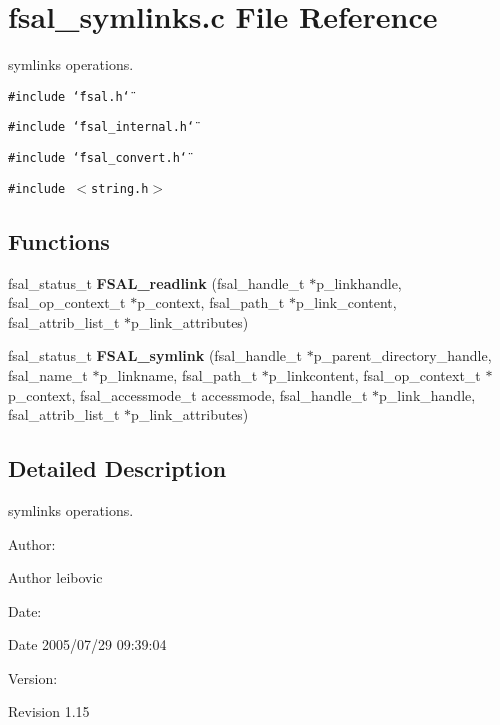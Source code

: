 \section{fsal\_\-symlinks.c File Reference}
\label{fsal__symlinks_8c}
symlinks operations. 

{\tt \#include \char`\"{}fsal.h\char`\"{}}\par
{\tt \#include \char`\"{}fsal\_\-internal.h\char`\"{}}\par
{\tt \#include \char`\"{}fsal\_\-convert.h\char`\"{}}\par
{\tt \#include $<$string.h$>$}\par
\subsection*{Functions}
\begin{CompactItemize}
\item 
fsal\_\-status\_\-t {\bf FSAL\_\-readlink} (fsal\_\-handle\_\-t $\ast$p\_\-linkhandle, fsal\_\-op\_\-context\_\-t $\ast$p\_\-context, fsal\_\-path\_\-t $\ast$p\_\-link\_\-content, fsal\_\-attrib\_\-list\_\-t $\ast$p\_\-link\_\-attributes)
\item 
fsal\_\-status\_\-t {\bf FSAL\_\-symlink} (fsal\_\-handle\_\-t $\ast$p\_\-parent\_\-directory\_\-handle, fsal\_\-name\_\-t $\ast$p\_\-linkname, fsal\_\-path\_\-t $\ast$p\_\-linkcontent, fsal\_\-op\_\-context\_\-t $\ast$p\_\-context, fsal\_\-accessmode\_\-t accessmode, fsal\_\-handle\_\-t $\ast$p\_\-link\_\-handle, fsal\_\-attrib\_\-list\_\-t $\ast$p\_\-link\_\-attributes)
\end{CompactItemize}


\subsection{Detailed Description}
symlinks operations. 

\begin{Desc}
\item[Author:]\begin{Desc}
\item[Author]leibovic \end{Desc}
\end{Desc}
\begin{Desc}
\item[Date:]\begin{Desc}
\item[Date]2005/07/29 09:39:04 \end{Desc}
\end{Desc}
\begin{Desc}
\item[Version:]\begin{Desc}
\item[Revision]1.15 \end{Desc}
\end{Desc}


